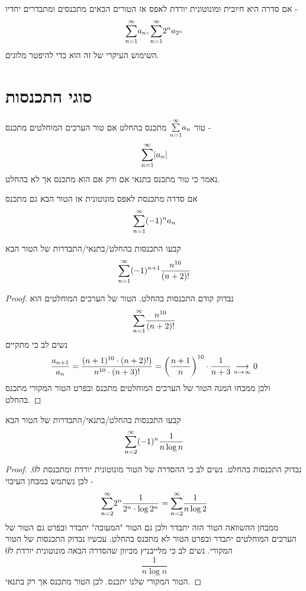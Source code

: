 \documentclass{article}
\begin{document}
\begin{theorem}
אם סדרה היא חיובית ומונוטונית יורדת לאפס אז הטורים הבאים מתכנסים ומתבדרים יחדיו - 
\[\overset{\infty}{\underset{n=1}{\sum}} a_n, \overset{\infty}{\underset{n=1}{\sum}} 2^n a_{2^n}\]
השימוש העיקרי של זה הוא כדי להיפטר מלוגים.
\end{theorem}

\section{סוגי התכנסות}
\begin{definition}
טור 
$\overset{\infty}{\underset{n=1}{\sum}} a_n$
מתכנס בהחלט אם טור הערכים המוחלטים מתכנס - 
\[\overset{\infty}{\underset{n=1}{\sum}} |a_n|\]
נאמר כי טור מתכנס בתנאי אם ורק אם הוא מתכנס אך לא בהחלט.
\end{definition}

\begin{theorem}
אם סדרה מתכנסת לאפס מונוטונית אז הטור הבא גם מתכנס 
\[\overset{\infty}{\underset{n=1}{\sum}} (-1)^n a_n\]
\end{theorem}

\begin{exercise}
קבעו התכנסות בהחלט/בתנאי/התבדרות של הטור הבא
\[\overset{\infty}{\underset{n=1}{\sum}} (-1)^{n+1} \frac{n^{10}}{(n+2)!}\]
\end{exercise}

\begin{proof}
נבדוק קודם התכנסות בהחלט. הטור של הערכים המוחלטים הוא 
\[\overset{\infty}{\underset{n=1}{\sum}} \frac{n^{10}}{(n+2)!}\]
נשים לב כי מתקיים 
\[\frac{a_{n+1}}{a_n} = \frac{(n+1)^{10}\cdot (n+2)!)}{n^{10}\cdot (n+3)!} = \left(\frac{n+1}{n}\right)^{10}\cdot \frac{1}{n+3}\underset{n\rightarrow\infty}{\longrightarrow} 0\]
ולכן ממבחו המנה הטור של הערכים המוחלטים מתכנס ובפרט הטור המקורי מתכנס בהחלט. 
\end{proof}

\begin{exercise}
קבעו התכנסות בהחלט/בתנאי/התבדרות של הטור הבא
\[\overset{\infty}{\underset{n=2}{\sum}} (-1)^{n} \frac{1}{n\log n}\]
\end{exercise}

\begin{proof}
נבדוק התכנסות בהחלט. נשים לב כי ההסדרה של הטור מונוטונית יורדת ומתכנסת ל0. לכן נשתמש במבחן העיבוי - 
\[\overset{\infty}{\underset{n=2}{\sum}} 2^n\frac{1}{2^n\cdot\log 2^n}  = \overset{\infty}{\underset{n=2}{\sum}}\frac{1}{n\log 2}\]
ממבחן ההשוואה הטור הזה יתבדר ולכן  גם הטור "המעובה" יתבדר ובפרט גם הטור של הערכים המוחלטים יתבדר ובפרט הטור לא מתכנס בהחלט. עכשיו נבדוק התכנסות של הטור המקורי. נשים לב כי מלייבניץ מכיוון שהסדרה הבאה מונוטונית יורדת ל0
\[\frac{1}{n\log n}\]
הטור המקורי שלנו יתכנס. לכן הטור מתכנס אך רק בתנאי.
\end{proof}
\end{document}
